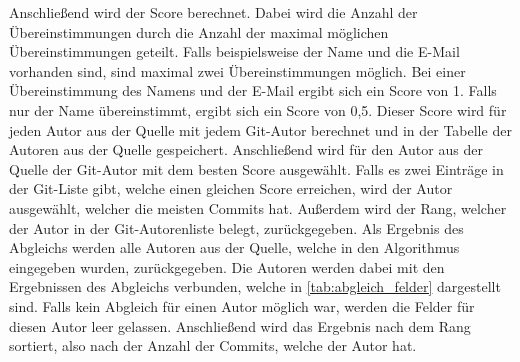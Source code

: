 Anschließend wird der Score berechnet.
Dabei wird die Anzahl der Übereinstimmungen durch die Anzahl der maximal möglichen Übereinstimmungen geteilt.
Falls beispielsweise der Name und die E-Mail vorhanden sind, sind maximal zwei Übereinstimmungen möglich.
Bei einer Übereinstimmung des Namens und der E-Mail ergibt sich ein Score von 1.
Falls nur der Name übereinstimmt, ergibt sich ein Score von 0,5.
Dieser Score wird für jeden Autor aus der Quelle mit jedem Git-Autor berechnet und in der Tabelle der Autoren aus der Quelle gespeichert.
Anschließend wird für den Autor aus der Quelle der Git-Autor mit dem besten Score ausgewählt.
Falls es zwei Einträge in der Git-Liste gibt, welche einen gleichen Score erreichen, wird der Autor ausgewählt, welcher die meisten Commits hat.
Außerdem wird der Rang, welcher der Autor in der Git-Autorenliste belegt, zurückgegeben.
Als Ergebnis des Abgleichs werden alle Autoren aus der Quelle, welche in den Algorithmus eingegeben wurden, zurückgegeben.
Die Autoren werden dabei mit den Ergebnissen des Abgleichs verbunden, welche in \autoref{tab:abgleich_felder} dargestellt sind.
Falls kein Abgleich für einen Autor möglich war, werden die Felder für diesen Autor leer gelassen.
Anschließend wird das Ergebnis nach dem Rang sortiert, also nach der Anzahl der Commits, welche der Autor hat.
